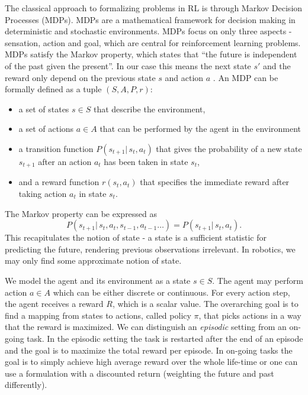 The classical approach to formalizing problems in RL is through
Markov Decision Processes (MDPs).
MDPs are a mathematical
framework for decision making in deterministic and stochastic environments.
MDPs focus on only three aspects
- sensation, action and goal, which are central
for reinforcement learning problems.
MDPs satisfy the Markov property, which
states that ``the future is independent
of the past given the present''. In our case this means
the next state $s'$ and the reward
only depend on the previous state $s$ and
action $a$ \citep{sutton1992reinforcement}.
An MDP can be formally defined as a tuple $(S, A, P, r)$:

\begin{itemize}
\item a set of states $s \in S$ that describe the environment,
\item a set of actions $a \in A$ that can be performed by the agent in
  the environment
\item a transition function $P(s_{t+1} |\, s_t, a_t)$ that
  gives the probability of a new
  state $s_{t+1}$ after an action $a_t$ has been taken in state $s_t$,
\item and a reward function $r(s_t, a_t)$ that specifies
  the immediate reward after taking action
  $a_t$ in state $s_t$.
\end{itemize}

The Markov property can be expressed as
$$ P(s_{t+1} |\, s_t, a_t, s_{t-1}, a_{t-1}\dots) = P(s_{t+1} |\, s_t, a_t). $$
This recapitulates the notion of state - a state is a sufficient statistic
for predicting the future, rendering previous observations irrelevant.
In robotics, we may only find some approximate notion of state.

We model the agent and its environment as a state $s \in S$.
The agent may perform action $ a \in A$ which can be
either discrete or continuous.
For every action step, the agent receives a reward $R$,
which is a scalar value.
The overarching goal is to find a mapping from states to actions,
called policy $\pi$, that picks actions in a way that
the reward is maximized.
We can distinguish an \textit{episodic} setting
from an on-going task.
In the episodic setting
the task is restarted after
the end of an episode and the goal is
to maximize the total reward per episode.
In on-going tasks the goal
is to simply achieve high average reward over
the whole life-time or one can use a formulation
with a discounted return (weighting the
future and past differently).

